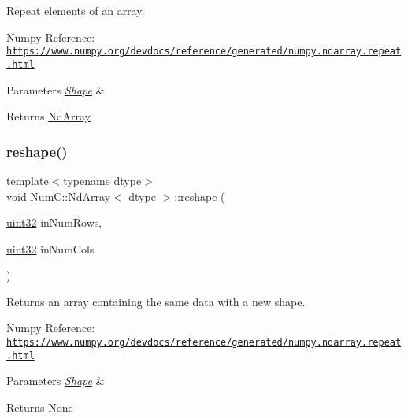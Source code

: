 Repeat elements of an array.

Numpy Reference\+: \href{https://www.numpy.org/devdocs/reference/generated/numpy.ndarray.repeat.html}{\tt https\+://www.\+numpy.\+org/devdocs/reference/generated/numpy.\+ndarray.\+repeat.\+html}


\begin{DoxyParams}{Parameters}
{\em \mbox{\hyperlink{class_num_c_1_1_shape}{Shape}}} & \\
\hline
\end{DoxyParams}
\begin{DoxyReturn}{Returns}
\mbox{\hyperlink{class_num_c_1_1_nd_array}{Nd\+Array}} 
\end{DoxyReturn}
\mbox{\label{class_num_c_1_1_nd_array_a55fbd9259848930ce641e62069c82bce}} 
\subsubsection{\texorpdfstring{reshape()}{reshape()}\hspace{0.1cm}{\footnotesize\ttfamily [1/2]}}
{\footnotesize\ttfamily template$<$typename dtype$>$ \\
void \mbox{\hyperlink{class_num_c_1_1_nd_array}{Num\+C\+::\+Nd\+Array}}$<$ dtype $>$\+::reshape (\begin{DoxyParamCaption}\item[{\mbox{\hyperlink{namespace_num_c_ae685802ca6d3035f2b400b081e3953fa}{uint32}}}]{in\+Num\+Rows,  }\item[{\mbox{\hyperlink{namespace_num_c_ae685802ca6d3035f2b400b081e3953fa}{uint32}}}]{in\+Num\+Cols }\end{DoxyParamCaption})\hspace{0.3cm}{\ttfamily [inline]}}

Returns an array containing the same data with a new shape.

Numpy Reference\+: \href{https://www.numpy.org/devdocs/reference/generated/numpy.ndarray.repeat.html}{\tt https\+://www.\+numpy.\+org/devdocs/reference/generated/numpy.\+ndarray.\+repeat.\+html}


\begin{DoxyParams}{Parameters}
{\em \mbox{\hyperlink{class_num_c_1_1_shape}{Shape}}} & \\
\hline
\end{DoxyParams}
\begin{DoxyReturn}{Returns}
None 
\end{DoxyReturn}
\mbox{\label{class_num_c_1_1_nd_array_a12296c59b04435b329317d2137c5e86e}} 
